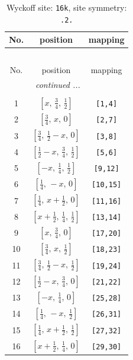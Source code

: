 \documentclass[fleqn,8pt]{jsarticle}
\begin{document}
\renewcommand{\arraystretch}{1.2}
\begin{longtable}{ccc}
\caption{Wyckoff site: {\tt 16k}, site symmetry: {\tt .2.}}
 \\
 \hline \hline
No. & position & mapping \\ \hline \endfirsthead

\multicolumn{2}{l}{\tablename\ \thetable{}} \\
 \hline \hline
No. & position & mapping \\ \hline \endhead

 \hline \hline
\multicolumn{2}{r}{\footnotesize\it continued ...} \\ \endfoot

 \hline \hline
\multicolumn{2}{r}{} \\ \endlastfoot

1 & $\left[ x,\, \frac{3}{4},\, \frac{1}{2} \right]$ & {\tt [1,4]} \\ \hline
2 & $\left[ \frac{3}{4},\, x,\, 0 \right]$ & {\tt [2,7]} \\ \hline
3 & $\left[ \frac{3}{4},\, \frac{1}{2} - x,\, 0 \right]$ & {\tt [3,8]} \\ \hline
4 & $\left[ \frac{1}{2} - x,\, \frac{3}{4},\, \frac{1}{2} \right]$ & {\tt [5,6]} \\ \hline
5 & $\left[ - x,\, \frac{1}{4},\, \frac{1}{2} \right]$ & {\tt [9,12]} \\ \hline
6 & $\left[ \frac{1}{4},\, - x,\, 0 \right]$ & {\tt [10,15]} \\ \hline
7 & $\left[ \frac{1}{4},\, x + \frac{1}{2},\, 0 \right]$ & {\tt [11,16]} \\ \hline
8 & $\left[ x + \frac{1}{2},\, \frac{1}{4},\, \frac{1}{2} \right]$ & {\tt [13,14]} \\ \hline
9 & $\left[ x,\, \frac{3}{4},\, 0 \right]$ & {\tt [17,20]} \\ \hline
10 & $\left[ \frac{3}{4},\, x,\, \frac{1}{2} \right]$ & {\tt [18,23]} \\ \hline
11 & $\left[ \frac{3}{4},\, \frac{1}{2} - x,\, \frac{1}{2} \right]$ & {\tt [19,24]} \\ \hline
12 & $\left[ \frac{1}{2} - x,\, \frac{3}{4},\, 0 \right]$ & {\tt [21,22]} \\ \hline
13 & $\left[ - x,\, \frac{1}{4},\, 0 \right]$ & {\tt [25,28]} \\ \hline
14 & $\left[ \frac{1}{4},\, - x,\, \frac{1}{2} \right]$ & {\tt [26,31]} \\ \hline
15 & $\left[ \frac{1}{4},\, x + \frac{1}{2},\, \frac{1}{2} \right]$ & {\tt [27,32]} \\ \hline
16 & $\left[ x + \frac{1}{2},\, \frac{1}{4},\, 0 \right]$ & {\tt [29,30]} \\
\end{longtable}
\end{document}
